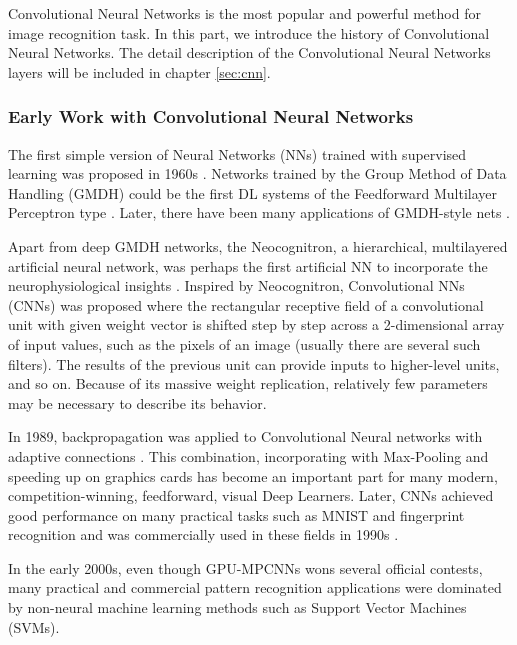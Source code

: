 Convolutional Neural Networks \cite{lecun1998gradient} is the most popular and powerful method for image recognition task. In this part, we introduce the history of Convolutional Neural Networks. The detail description of the Convolutional Neural Networks layers will be included in chapter \ref{sec:cnn}.

\subsubsection{Early Work with Convolutional Neural Networks}
The first simple version of Neural Networks (NNs) trained with supervised learning was proposed in 1960s  \cite{rosenblatt1958perceptron}\cite{rosenblatt1962principles}. Networks trained by the Group Method of Data Handling (GMDH) could be the first DL systems of the Feedforward Multilayer Perceptron type \cite{ivakhnenko1965cybernetic}\cite{Schmidhuber14}. Later, there have been many applications of GMDH-style
nets \cite{farlow1984self} \cite{ikeda1976sequential} \cite{kondo2008multi} \cite{witczak2006gmdh}.

Apart from deep GMDH networks, the Neocognitron, a hierarchical, multilayered artificial neural network, was perhaps the first artificial NN to incorporate the
neurophysiological insights \cite{fukushima1980neocognitron}. Inspired by Neocognitron, Convolutional NNs (CNNs) was proposed where the rectangular receptive field of a convolutional unit with given weight vector is shifted step by step across a 2-dimensional array of input values, such as the pixels of an image (usually there are several such filters). The results of the previous unit can provide inputs to higher-level units, and so on. Because of its massive weight replication,  relatively few parameters may be necessary to describe its behavior.

In 1989, backpropagation \cite{lecun1989backpropagation}\cite{lecun1998gradient} was applied to Convolutional Neural networks with adaptive connections \cite{lecun1989backpropagation}. This combination, incorporating with Max-Pooling and speeding up on graphics cards has become an important part for many modern, competition-winning, feedforward, visual Deep Learners. Later, CNNs achieved good performance on many practical tasks such as MNIST and fingerprint recognition and was commercially used in these fields in 1990s \cite{baldi1993neural} \cite{le1990handwritten}. 

In the early 2000s, even though GPU-MPCNNs wons several official contests, many practical and commercial pattern recognition applications were dominated by non-neural machine learning methods such as Support Vector Machines (SVMs).

